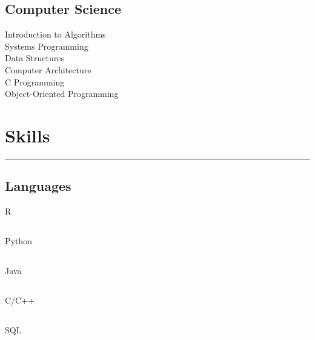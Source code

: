 \documentclass[]{sahana}
\begin{document}
\begin{minipage}[t]{0.33\textwidth}
\subsection{Computer Science}
Introduction to Algorithms\\
Systems Programming\\
Data Structures\\
Computer Architecture\\
C Programming\\
Object-Oriented Programming
\sectionsep

\section{Skills}
\noindent\rule{5cm}{0.4pt}
\subsection{Languages}
R \hfill{}\hspace{30pt}
\subsection{}\vspace{-12pt}
Python \hfill{}\hspace{30pt}
\subsection{}\vspace{-12pt}
Java \hfill{}\hspace{30pt}
\subsection{}\vspace{-12pt}
C/C++ \hfill{}\hspace{30pt}
\subsection{}\vspace{-12pt}
SQL \hspace*{0pt}\hfill{}\hspace{30pt}

\end{minipage}
\end{document}
